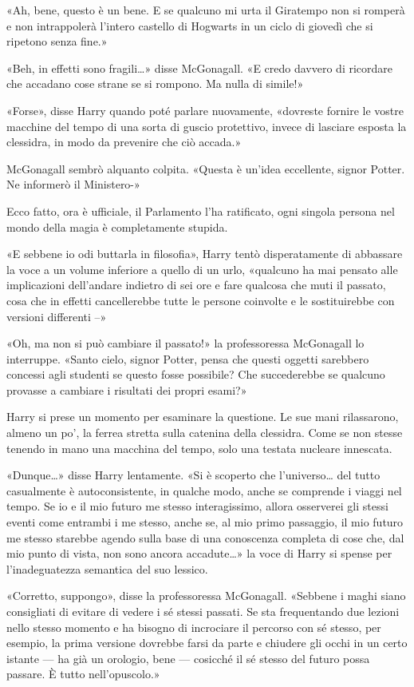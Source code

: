 «Ah, bene, questo è un bene. E se qualcuno mi urta il Giratempo non si romperà e non intrappolerà l’intero castello di Hogwarts in un ciclo di giovedì che si ripetono senza fine.»

«Beh, in effetti sono fragili…» disse McGonagall. «E credo davvero di ricordare che accadano cose strane se si rompono. Ma nulla di simile!»

«Forse», disse Harry quando poté parlare nuovamente, «dovreste fornire le vostre macchine del tempo di una sorta di guscio protettivo, invece di lasciare esposta la clessidra, in modo da prevenire che ciò accada.»

McGonagall sembrò alquanto colpita. «Questa è un’idea eccellente, signor Potter. Ne informerò il Ministero-»

Ecco fatto, ora è ufficiale, il Parlamento l’ha ratificato, ogni singola persona nel mondo della magia è completamente stupida.

«E sebbene io odi buttarla in filosofia», Harry tentò disperatamente di abbassare la voce a un volume inferiore a quello di un urlo, «qualcuno ha mai pensato alle implicazioni dell’andare indietro di sei ore e fare qualcosa che muti il passato, cosa che in effetti cancellerebbe tutte le persone coinvolte e le sostituirebbe con versioni differenti –»

«Oh, ma non si può cambiare il passato!» la professoressa McGonagall lo interruppe. «Santo cielo, signor Potter, pensa che questi oggetti sarebbero concessi agli studenti se questo fosse possibile? Che succederebbe se qualcuno provasse a cambiare i risultati dei propri esami?»

Harry si prese un momento per esaminare la questione. Le sue mani rilassarono, almeno un po’, la ferrea stretta sulla catenina della clessidra. Come se non stesse tenendo in mano una macchina del tempo, solo una testata nucleare innescata.

«Dunque…» disse Harry lentamente. «Si è scoperto che l’universo… del tutto casualmente è autoconsistente, in qualche modo, anche se comprende i viaggi nel tempo. Se io e il mio futuro me stesso interagissimo, allora osserverei gli stessi eventi come entrambi i me stesso, anche se, al mio primo passaggio, il mio futuro me stesso starebbe agendo sulla base di una conoscenza completa di cose che, dal mio punto di vista, non sono ancora accadute…» la voce di Harry si spense per l’inadeguatezza semantica del suo lessico.

«Corretto, suppongo», disse la professoressa McGonagall. «Sebbene i maghi siano consigliati di evitare di vedere i sé stessi passati. Se sta frequentando due lezioni nello stesso momento e ha bisogno di incrociare il percorso con sé stesso, per esempio, la prima versione dovrebbe farsi da parte e chiudere gli occhi in un certo istante — ha già un orologio, bene — cosicché il sé stesso del futuro possa passare. È tutto nell’opuscolo.»

